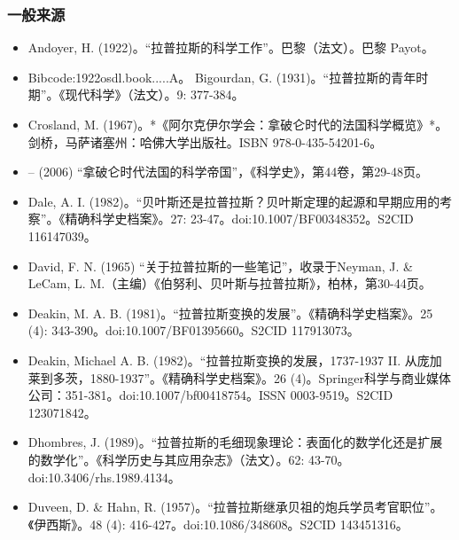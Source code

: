 \subsubsection{一般来源}  
\begin{itemize}
\item Andoyer, H. (1922)。“拉普拉斯的科学工作”。巴黎（法文）。巴黎 Payot。\item Bibcode:1922osdl.book.....A。  
Bigourdan, G. (1931)。“拉普拉斯的青年时期”。《现代科学》（法文）。9: 377-384。  
\item Crosland, M. (1967)。*《阿尔克伊尔学会：拿破仑时代的法国科学概览》*。剑桥，马萨诸塞州：哈佛大学出版社。ISBN 978-0-435-54201-6。  
\item – (2006) “拿破仑时代法国的科学帝国”，《科学史》，第44卷，第29-48页。  
\item Dale, A. I. (1982)。“贝叶斯还是拉普拉斯？贝叶斯定理的起源和早期应用的考察”。《精确科学史档案》。27: 23-47。doi:10.1007/BF00348352。S2CID 116147039。  
\item David, F. N. (1965) “关于拉普拉斯的一些笔记”，收录于Neyman, J. & LeCam, L. M.（主编）《伯努利、贝叶斯与拉普拉斯》，柏林，第30-44页。  
\item Deakin, M. A. B. (1981)。“拉普拉斯变换的发展”。《精确科学史档案》。25 (4): 343-390。doi:10.1007/BF01395660。S2CID 117913073。  
\item Deakin, Michael A. B. (1982)。“拉普拉斯变换的发展，1737-1937 II. 从庞加莱到多茨，1880-1937”。《精确科学史档案》。26 (4)。Springer科学与商业媒体公司：351-381。doi:10.1007/bf00418754。ISSN 0003-9519。S2CID 123071842。  
\item Dhombres, J. (1989)。“拉普拉斯的毛细现象理论：表面化的数学化还是扩展的数学化”。《科学历史与其应用杂志》（法文）。62: 43-70。doi:10.3406/rhs.1989.4134。  
\item Duveen, D. & Hahn, R. (1957)。“拉普拉斯继承贝祖的炮兵学员考官职位”。《伊西斯》。48 (4): 416-427。doi:10.1086/348608。S2CID 143451316。


\end{itemize}

